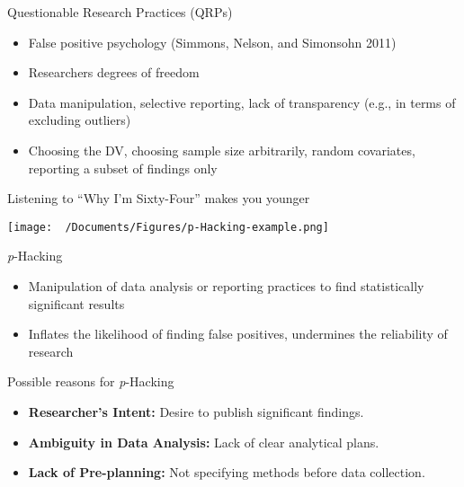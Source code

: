 \documentclass[
  ignorenonframetext,
  aspectratio=169,
]{beamer}
\providecommand{\tightlist}{%
  \setlength{\itemsep}{0pt}\setlength{\parskip}{0pt}}\usepackage{longtable,booktabs,array}
\begin{document}
\begin{frame}{Questionable Research Practices (QRPs)}
\label{questionable-research-practices-qrps}
\begin{itemize}[<+->]
\tightlist
\item
  False positive psychology (Simmons, Nelson, and Simonsohn 2011)
\item
  Researchers degrees of freedom
\item
  Data manipulation, selective reporting, lack of transparency (e.g., in
  terms of excluding outliers)
\item
  Choosing the DV, choosing sample size arbitrarily, random covariates,
  reporting a subset of findings only
\end{itemize}
\end{frame}

\begin{frame}{Listening to ``Why I'm Sixty-Four'' makes you younger}
\label{listening-to-why-im-sixty-four-makes-you-younger}
\begin{center}
\texttt{[image: ~/Documents/Figures/p-Hacking-example.png]}
\end{center}
\end{frame}

\begin{frame}{\emph{p}-Hacking}
\label{p-hacking}
\begin{itemize}[<+->]
\tightlist
\item
  Manipulation of data analysis or reporting practices to find
  statistically significant results
\item
  Inflates the likelihood of finding false positives, undermines the
  reliability of research
\end{itemize}
\end{frame}

\begin{frame}{Possible reasons for \emph{p}-Hacking}
\label{possible-reasons-for-p-hacking}
\begin{itemize}[<+->]
\tightlist
\item
  \textbf{Researcher's Intent:} Desire to publish significant findings.
\item
  \textbf{Ambiguity in Data Analysis:} Lack of clear analytical plans.
\item
  \textbf{Lack of Pre-planning:} Not specifying methods before data
  collection.
\end{itemize}
\end{frame}
\end{document}
